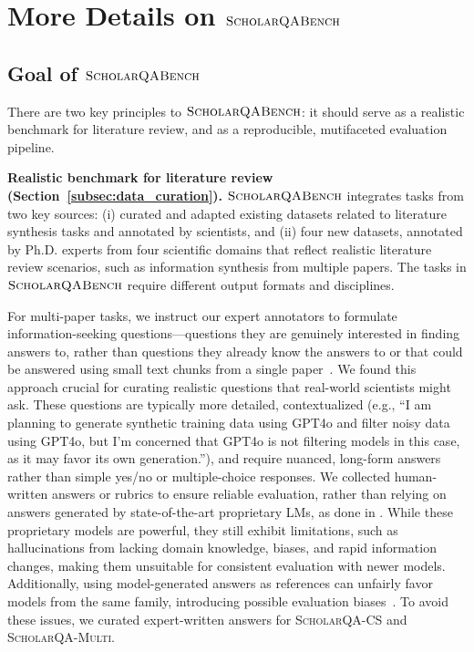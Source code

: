 \documentclass{article} %
\newcommand{\data}{$\textsc{ScholarQABench}$\xspace}
\renewcommand{\paragraph}[1]{\noindent \textbf{#1}}
\newcommand{\Sref}[1]{Section~\ref{#1}}
\begin{document}
\section{More Details on \data}

\subsection{Goal of \data}
There are two key principles to \data: it should serve as a realistic benchmark for literature review, and as a reproducible, mutifaceted evaluation pipeline. 

\paragraph{Realistic benchmark for literature review (\Sref{subsec:data_curation}).} 
\data integrates tasks from two key sources: (i) curated and adapted existing datasets related to literature synthesis tasks and annotated by scientists, and (ii) four new datasets, annotated by Ph.D. experts from four scientific domains that reflect realistic literature review scenarios, such as information synthesis from multiple papers. 
The tasks in \data require different output formats and disciplines. 

For multi-paper tasks, we instruct our expert annotators to formulate information-seeking questions—questions they are genuinely interested in finding answers to, rather than questions they already know the answers to or that could be answered using small text chunks from a single paper~\citep{asai-choi-2021-challenges, choi-etal-2018-quac}. 
We found this approach crucial for curating realistic questions that real-world scientists might ask. These questions are typically more detailed, contextualized (e.g., ``I am planning to generate synthetic training data using GPT4o and filter noisy data using GPT4o, but I'm concerned that GPT4o is not filtering models in this case, as it may favor its own generation.''), and require nuanced, long-form answers rather than simple yes/no or multiple-choice responses. 
We collected human-written answers or rubrics to ensure reliable evaluation, rather than relying on answers generated by state-of-the-art proprietary LMs, as done in \citet{xu-etal-2024-kiwi, malaviya2023expertqa}. While these proprietary models are powerful, they still exhibit limitations, such as hallucinations from lacking domain knowledge, biases, and rapid information changes, making them unsuitable for consistent evaluation with newer models. Additionally, using model-generated answers as references can unfairly favor models from the same family, introducing possible evaluation biases~\cite{panickssery2024llm}. To avoid these issues, we curated expert-written answers for \textsc{ScholarQA-CS} and \textsc{ScholarQA-Multi}.   
\end{document}
